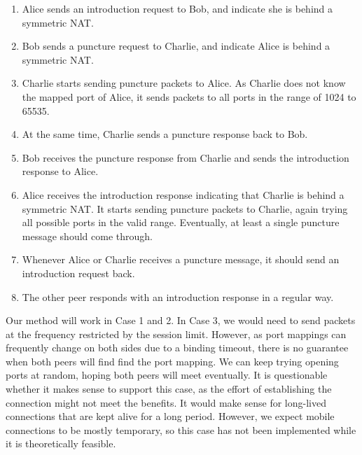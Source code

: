 \begin{enumerate}
    \item Alice sends an introduction request to Bob, and indicate she is behind a symmetric NAT.
    \item Bob sends a puncture request to Charlie, and indicate Alice is behind a symmetric NAT.
    \item Charlie starts sending puncture packets to Alice. As Charlie does not know the mapped port of Alice, it sends packets to all ports in the range of 1024 to 65535.
    \item At the same time, Charlie sends a puncture response back to Bob.
    \item Bob receives the puncture response from Charlie and sends the introduction response to Alice.
    \item Alice receives the introduction response indicating that Charlie is behind a symmetric NAT. It starts sending puncture packets to Charlie, again trying all possible ports in the valid range. Eventually, at least a single puncture message should come through.
    \item Whenever Alice or Charlie receives a puncture message, it should send an introduction request back.
    \item The other peer responds with an introduction response in a regular way.
\end{enumerate}

Our method will work in Case 1 and 2. In Case 3, we would need to send packets at the frequency restricted by the session limit. However, as port mappings can frequently change on both sides due to a binding timeout, there is no guarantee when both peers will find find the port mapping. We can keep trying opening ports at random, hoping both peers will meet eventually.
It is questionable whether it makes sense to support this case, as the effort of establishing the connection might not meet the benefits. It would make sense for long-lived connections that are kept alive for a long period. However, we expect mobile connections to be mostly temporary, so this case has not been implemented while it is theoretically feasible.

